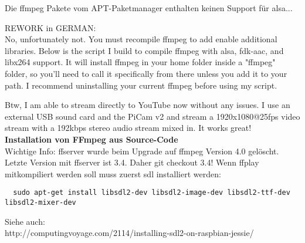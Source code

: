 Die ffmpeg Pakete vom APT-Paketmanager enthalten keinen Support für alsa...
   
REWORK in GERMAN:\\
No, unfortunately not. You must recompile ffmpeg to add enable additional libraries. Below is the script I build to compile ffmpeg with alsa, fdk-aac, and libx264 support. It will install ffmpeg in your home folder inside a "ffmpeg" folder, so you'll need to call it specifically from there unless you add it to your path. I recommend uninstalling your current ffmpeg before using my script.

Btw, I am able to stream directly to YouTube now without any issues. I use an external USB sound card and the PiCam v2 and stream a 1920x1080@25fps video stream with a 192kbps stereo audio stream mixed in. It works great!\\

\textbf{Installation von FFmpeg aus Source-Code}\\
Wichtige Info: ffserver wurde beim Upgrade auf ffmpeg Version 4.0 gelöscht. Letzte Version mit ffserver ist 3.4. Daher git checkout 3.4! Wenn ffplay mitkompiliert werden soll muss zuerst sdl installiert werden:\\
\begin{verbatim}
  sudo apt-get install libsdl2-dev libsdl2-image-dev libsdl2-ttf-dev libsdl2-mixer-dev
\end{verbatim}
Siehe auch:\\
http://computingvoyage.com/2114/installing-sdl2-on-raspbian-jessie/

